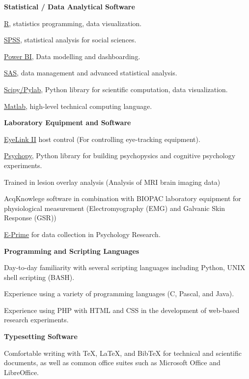 \documentclass[10pt]{article}
\newenvironment{innerlist}[1][\enskip\textbullet]%
        {\begin{compactenum}[#1]}{\end{compactenum}}
\providecommand{\tightlist}{%
  \setlength{\itemsep}{0pt}\setlength{\parskip}{0pt}}
\begin{document}
\begin{outerlist}
\tightlist
\item
  \textbf{Statistical / Data Analytical Software}

 \begin{innerlist}
  \tightlist
  \item
    \href{http://www.r-project.org/}{R}, statistics programming, data
    visualization.
  \item
    \href{http://www.spss.com/}{SPSS}, statistical analysis for social
    sciences.
  \item
    \href{https://powerbi.microsoft.com/en-ca/}{Power BI}, Data
    modelling and dashboarding.
  \item
    \href{http://www.sas.com/}{SAS}, data management and advanced
    statistical analysis.
  \item
    \href{http://www.scipy.org/}{Scipy/Pylab}, Python library for
    scientific computation, data visualization.
  \item
    \href{https://www.mathworks.com/products/matlab/}{Matlab},
    high-level technical computing language.
 \end{innerlist}
\item
  \textbf{Laboratory Equipment and Software}

 \begin{innerlist}
  \tightlist
  \item
    \href{www.sr-research.com}{EyeLink II} host control (For controlling
    eye-tracking equipment).
  \item
    \href{http://www.psychopy.org/}{Psychopy}, Python library for
    building psychopysics and cognitive psychology experiments.
  \item
    Trained in lesion overlay analysis (Analysis of MRI brain imaging
    data)
  \item
    AcqKnowlege software in combination with BIOPAC laboratory equipment
    for physiological measurement (Electromyography (EMG) and Galvanic
    Skin Response (GSR))
  \item
    \href{http://www.pstnet.com/products/e-prime/}{E-Prime} for data
    collection in Psychology Research.
 \end{innerlist}
\item
  \textbf{Programming and Scripting Languages}

 \begin{innerlist}
  \tightlist
  \item
    Day-to-day familiarity with several scripting languages including
    Python, UNIX shell scripting (BASH).
  \item
    Experience using a variety of programming languages (C, Pascal, and
    Java).
  \item
    Experience using PHP with HTML and CSS in the development of
    web-based research experiments.
 \end{innerlist}
\item
  \textbf{Typesetting Software}

 \begin{innerlist}
  \tightlist
  \item
    Comfortable writing with TeX, LaTeX, and BibTeX for technical and
    scientific documents, as well as common office suites such as
    Microsoft Office and LibreOffice.
 \end{innerlist}
\end{outerlist}

\pagebreak[3]
\end{document}
